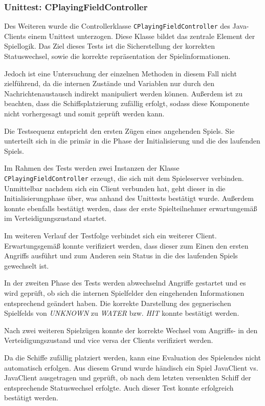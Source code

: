 \subsubsection{Unittest: CPlayingFieldController}
Des Weiteren wurde die Controllerklasse \texttt{CPlayingFieldController} des Java-Clients einem Unittest unterzogen.
Diese Klasse bildet das zentrale Element der Spiellogik.
Das Ziel dieses Tests ist die Sicherstellung der korrekten Statuswechsel, sowie die korrekte repräsentation der Spielinformationen.

Jedoch ist eine Untersuchung der einzelnen Methoden in diesem Fall nicht zielführend, da die internen Zustände und Variablen nur durch den Nachrichtenaustausch indirekt manipuliert werden können.
Außerdem ist zu beachten, dass die Schiffsplatzierung zufällig erfolgt, sodass diese Komponente nicht vorhergesagt und somit geprüft werden kann.

Die Testsequenz entspricht den ersten Zügen eines angehenden Spiels. 
Sie unterteilt sich in die primär in die Phase der Initialisierung und die des laufenden Spiels.

Im Rahmen des Tests werden zwei Instanzen der Klasse \texttt{CPlayingFieldController} erzeugt, die sich mit dem Spieleserver verbinden.
Unmittelbar nachdem sich ein Client verbunden hat, geht dieser in die Initialisierungphase über, was anhand des Unittests bestätigt wurde.
Außerdem konnte ebenfalls bestätigt werden, dass der erste Spielteilnehmer erwartungemäß im Verteidigungszustand startet.

Im weiteren Verlauf der Testfolge verbindet sich ein weiterer Client.
Erwartungsgemäß konnte verifiziert werden, dass dieser zum Einen den ersten Angriffs ausführt und zum Anderen sein Status in die des laufenden Spiels gewechselt ist.

In der zweiten Phase des Tests werden abwechselnd Angriffe gestartet und es wird geprüft, ob sich die internen Spielfelder den eingehenden Informationen entsprechend geändert haben.
Die korrekte Darstellung des gegnerischen Spielfelds von \emph{UNKNOWN} zu \emph{WATER} bzw. \emph{HIT} konnte bestätigt werden.

Nach zwei weiteren Spielzügen konnte der korrekte Wechsel vom Angriffs- in den Verteidigungszustand und vice versa der Clients verifiziert werden.

Da die Schiffe zufällig platziert werden, kann eine Evaluation des Spielendes nicht automatisch erfolgen.
Aus diesem Grund wurde händisch ein Spiel JavaClient vs. JavaClient ausgetragen und geprüft, ob nach dem letzten versenkten Schiff der entsprechende Statuswechsel erfolgte.
Auch dieser Test konnte erfolgreich bestätigt werden.